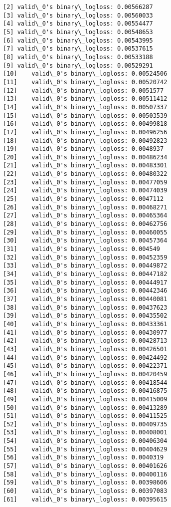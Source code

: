 \documentclass[11pt]{article}
\begin{document}
\begin{Verbatim}[commandchars=\\\{\}]
[2]	valid\_0's binary\_logloss: 0.00566287
[3]	valid\_0's binary\_logloss: 0.00560033
[4]	valid\_0's binary\_logloss: 0.00554477
[5]	valid\_0's binary\_logloss: 0.00548653
[6]	valid\_0's binary\_logloss: 0.00543995
[7]	valid\_0's binary\_logloss: 0.00537615
[8]	valid\_0's binary\_logloss: 0.00533188
[9]	valid\_0's binary\_logloss: 0.00529291
[10]	valid\_0's binary\_logloss: 0.00524506
[11]	valid\_0's binary\_logloss: 0.00520742
[12]	valid\_0's binary\_logloss: 0.0051577
[13]	valid\_0's binary\_logloss: 0.00511412
[14]	valid\_0's binary\_logloss: 0.00507337
[15]	valid\_0's binary\_logloss: 0.00503539
[16]	valid\_0's binary\_logloss: 0.00499818
[17]	valid\_0's binary\_logloss: 0.00496256
[18]	valid\_0's binary\_logloss: 0.00492823
[19]	valid\_0's binary\_logloss: 0.0048937
[20]	valid\_0's binary\_logloss: 0.00486234
[21]	valid\_0's binary\_logloss: 0.00483301
[22]	valid\_0's binary\_logloss: 0.00480322
[23]	valid\_0's binary\_logloss: 0.00477059
[24]	valid\_0's binary\_logloss: 0.00474039
[25]	valid\_0's binary\_logloss: 0.0047112
[26]	valid\_0's binary\_logloss: 0.00468271
[27]	valid\_0's binary\_logloss: 0.00465364
[28]	valid\_0's binary\_logloss: 0.00462756
[29]	valid\_0's binary\_logloss: 0.00460055
[30]	valid\_0's binary\_logloss: 0.00457364
[31]	valid\_0's binary\_logloss: 0.004549
[32]	valid\_0's binary\_logloss: 0.00452359
[33]	valid\_0's binary\_logloss: 0.00449872
[34]	valid\_0's binary\_logloss: 0.00447182
[35]	valid\_0's binary\_logloss: 0.00444917
[36]	valid\_0's binary\_logloss: 0.00442346
[37]	valid\_0's binary\_logloss: 0.00440081
[38]	valid\_0's binary\_logloss: 0.00437623
[39]	valid\_0's binary\_logloss: 0.00435502
[40]	valid\_0's binary\_logloss: 0.00433361
[41]	valid\_0's binary\_logloss: 0.00430977
[42]	valid\_0's binary\_logloss: 0.00428713
[43]	valid\_0's binary\_logloss: 0.00426501
[44]	valid\_0's binary\_logloss: 0.00424492
[45]	valid\_0's binary\_logloss: 0.00422371
[46]	valid\_0's binary\_logloss: 0.00420459
[47]	valid\_0's binary\_logloss: 0.00418544
[48]	valid\_0's binary\_logloss: 0.00416875
[49]	valid\_0's binary\_logloss: 0.00415009
[50]	valid\_0's binary\_logloss: 0.00413289
[51]	valid\_0's binary\_logloss: 0.00411525
[52]	valid\_0's binary\_logloss: 0.00409735
[53]	valid\_0's binary\_logloss: 0.00408001
[54]	valid\_0's binary\_logloss: 0.00406304
[55]	valid\_0's binary\_logloss: 0.00404629
[56]	valid\_0's binary\_logloss: 0.0040319
[57]	valid\_0's binary\_logloss: 0.00401626
[58]	valid\_0's binary\_logloss: 0.00400116
[59]	valid\_0's binary\_logloss: 0.00398606
[60]	valid\_0's binary\_logloss: 0.00397083
[61]	valid\_0's binary\_logloss: 0.00395615

\end{Verbatim}
\end{document}
